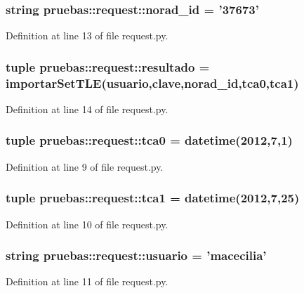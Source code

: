 \subsubsection[{norad\-\_\-id}]{\setlength{\rightskip}{0pt plus 5cm}string {\bf pruebas\-::request\-::norad\-\_\-id} = '37673'}\label{namespacepruebas_1_1request_a743ff3189e7a30f3802f204d807f4d17}


\-Definition at line 13 of file request.\-py.

\subsubsection[{resultado}]{\setlength{\rightskip}{0pt plus 5cm}tuple {\bf pruebas\-::request\-::resultado} = {\bf importar\-Set\-T\-L\-E}({\bf usuario},{\bf clave},{\bf norad\-\_\-id},{\bf tca0},{\bf tca1})}\label{namespacepruebas_1_1request_a8624e7740ce90c893d34175fbdffcd42}


\-Definition at line 14 of file request.\-py.

\subsubsection[{tca0}]{\setlength{\rightskip}{0pt plus 5cm}tuple {\bf pruebas\-::request\-::tca0} = datetime(2012,7,1)}\label{namespacepruebas_1_1request_a1580b9827fceeab0ee9b153a97c014c8}


\-Definition at line 9 of file request.\-py.

\subsubsection[{tca1}]{\setlength{\rightskip}{0pt plus 5cm}tuple {\bf pruebas\-::request\-::tca1} = datetime(2012,7,25)}\label{namespacepruebas_1_1request_a1f2d3c0e526f58ea41855cdc52c1664c}


\-Definition at line 10 of file request.\-py.

\subsubsection[{usuario}]{\setlength{\rightskip}{0pt plus 5cm}string {\bf pruebas\-::request\-::usuario} = 'macecilia'}\label{namespacepruebas_1_1request_aa25f656d9b762b295e7dde7bc99f4bdd}


\-Definition at line 11 of file request.\-py.

